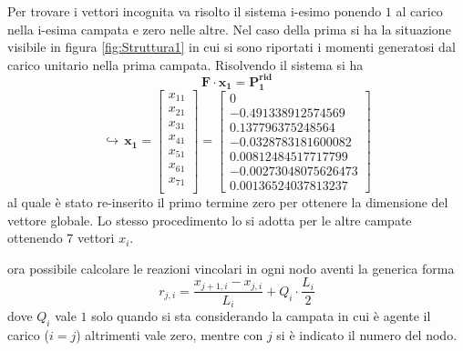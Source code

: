  
Per trovare i vettori incognita va risolto il sistema i-esimo ponendo $1$ al carico nella i-esima campata e zero nelle altre.
Nel caso della prima si ha la situazione visibile in figura \ref{fig:Struttura1} in cui si sono riportati i momenti generatosi dal carico unitario nella prima campata.
Risolvendo il sistema si ha 
\begin{equation}
\mathbf{F\cdot x_1 = P^{rid}_{1}}
\end{equation}
\begin{equation}
\hookrightarrow \, \mathbf{x_1}=
\begin{bmatrix}
x_{11}\\
x_{21}\\
x_{31}\\
x_{41}\\
x_{51}\\
x_{61}\\
x_{71}\\
\end{bmatrix} =
\begin{bmatrix}
0\\
-0.491338912574569 \\
0.137796375248564 \\
-0.0328783181600082 \\
0.00812484517717799 \\
-0.00273048075626473 \\
0.00136524037813237
\end{bmatrix}
\end{equation} 
al quale è stato re-inserito il primo termine zero per ottenere la dimensione del vettore globale.
Lo stesso procedimento lo si adotta per le altre campate ottenendo 7 vettori $x_i$.

\e ora possibile calcolare le reazioni vincolari in ogni nodo aventi la generica forma
\begin{equation}
r_{j,i}=\frac{x_{j+1,i}-x_{j,i}}{L_i}+Q_i\cdot\frac{L_i}{2}
\end{equation} dove $Q_i$ vale $1$ solo quando si sta considerando la campata in cui è agente il carico ($i=j$) altrimenti vale zero, mentre con $j$ si è indicato il numero del nodo.

